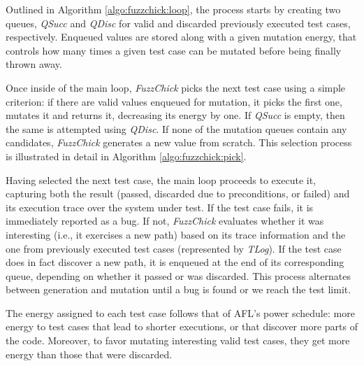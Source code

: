\documentclass[acmsmall, anonymous]{acmart}
\newcommand{\fuzzchick}{\textit{FuzzChick}\xspace}
\begin{document}
Outlined in Algorithm \ref{algo:fuzzchick:loop}, the process starts by creating
two queues, \textit{QSucc} and \textit{QDisc} for valid and discarded previously
executed test cases, respectively.
%
Enqueued values are stored along with a given mutation energy, that controls how
many times a given test case can be mutated before being finally thrown away.


Once inside of the main loop, \fuzzchick picks the next test case using a simple
criterion: if there are valid values enqueued for mutation, it picks the first
one, mutates it and returns it, decreasing its energy by one.
%
If \textit{QSucc} is empty, then the same is attempted using \textit{QDisc}.
%
If none of the mutation queues contain any candidates, \fuzzchick generates a
new value from scratch.
%
This selection process is illustrated in detail in Algorithm
\ref{algo:fuzzchick:pick}.


Having selected the next test case, the main loop proceeds to execute it,
capturing both the result (passed, discarded due to preconditions, or failed)
and its execution trace over the system under test.
%
If the test case fails, it is immediately reported as a bug.
%
If not, \fuzzchick evaluates whether it was interesting (i.e., it exercises a
new path) based on its trace information and the one from previously executed
test cases (represented by \textit{TLog}).
%
If the test case does in fact discover a new path, it is enqueued at the end of
its corresponding queue, depending on whether it passed or was discarded.
%
%
This process alternates between generation and mutation until a bug is found or
we reach the test limit.


The energy assigned to each test case follows that of AFL's power schedule: more
energy to test cases that lead to shorter executions, or that discover more
parts of the code.
%
Moreover, to favor mutating interesting valid test cases, they get more energy
than those that were discarded.
\end{document}
